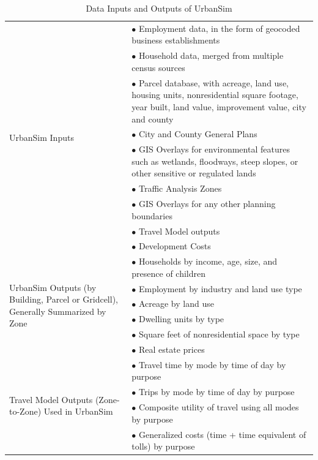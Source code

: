 \begin{table}[htp]
\caption{Data Inputs and Outputs of UrbanSim}
\label{tab:inputs-outputs}
\begin{center}
\begin{tabular}{ p{1.5in}  p{4.4in}  }
\toprule[1.5pt]
\multirow{9}{1.5in}{UrbanSim Inputs}
&   $\bullet$ Employment data, in the form of geocoded business establishments\\
&   $\bullet$ Household data, merged from multiple census sources\\
&   $\bullet$  Parcel database, with acreage, land use, housing units, nonresidential square footage, year built, land value, improvement value, city and county\\
&   $\bullet$  City and County General Plans\\
&   $\bullet$  GIS Overlays for environmental features such as wetlands, floodways, steep slopes, or other sensitive or regulated lands\\
&   $\bullet$  Traffic Analysis Zones\\
&   $\bullet$   GIS Overlays for any other planning boundaries\\
&   $\bullet$  Travel Model outputs\\
&  $\bullet$   Development Costs \\
\midrule
\multirow{6}{1.5in}{UrbanSim Outputs (by Building, Parcel or Gridcell), Generally Summarized by Zone}
& $\bullet$    Households by income, age, size, and presence of children\\
& $\bullet$    Employment by industry and land use type\\
& $\bullet$    Acreage by land use\\
& $\bullet$    Dwelling units by type\\
& $\bullet$    Square feet of nonresidential space by type\\
& $\bullet$    Real estate prices\\
\midrule
\multirow{4}{1.5in}{Travel Model Outputs (Zone-to-Zone) Used in UrbanSim}
& $\bullet$    Travel time by mode by time of day by purpose\\
& $\bullet$  Trips by mode by time of day by purpose\\
& $\bullet$    Composite utility of travel using all modes by purpose \\
& $\bullet$  Generalized costs (time + time equivalent of tolls) by purpose \\
\bottomrule
\end{tabular}
\end{center}
\end{table}

